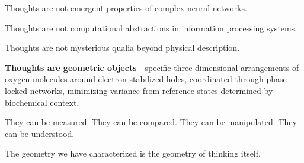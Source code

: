 Thoughts are not emergent properties of complex neural networks.

Thoughts are not computational abstractions in information processing systems.

Thoughts are not mysterious qualia beyond physical description.

\textbf{Thoughts are geometric objects}—specific three-dimensional arrangements of oxygen molecules around electron-stabilized holes, coordinated through phase-locked networks, minimizing variance from reference states determined by biochemical context.

They can be measured. They can be compared. They can be manipulated. They can be understood.

The geometry we have characterized is the geometry of thinking itself.
